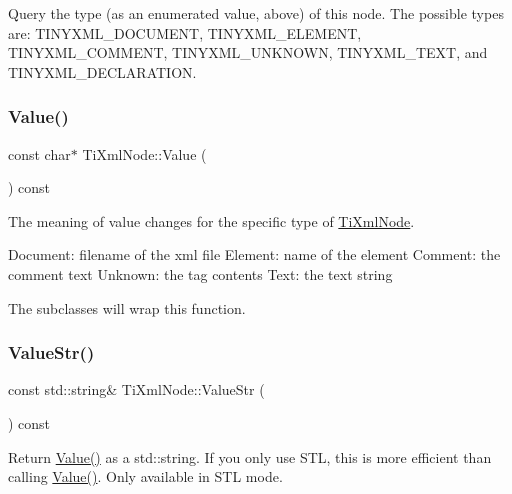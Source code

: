 Query the type (as an enumerated value, above) of this node. The possible types are\+: T\+I\+N\+Y\+X\+M\+L\+\_\+\+D\+O\+C\+U\+M\+E\+NT, T\+I\+N\+Y\+X\+M\+L\+\_\+\+E\+L\+E\+M\+E\+NT, T\+I\+N\+Y\+X\+M\+L\+\_\+\+C\+O\+M\+M\+E\+NT, T\+I\+N\+Y\+X\+M\+L\+\_\+\+U\+N\+K\+N\+O\+WN, T\+I\+N\+Y\+X\+M\+L\+\_\+\+T\+E\+XT, and T\+I\+N\+Y\+X\+M\+L\+\_\+\+D\+E\+C\+L\+A\+R\+A\+T\+I\+ON. \mbox{\label{class_ti_xml_node_ad44dfe927d49a74dd78b72b7514417ad}} 
\subsubsection{\texorpdfstring{Value()}{Value()}}
{\footnotesize\ttfamily const char$\ast$ Ti\+Xml\+Node\+::\+Value (\begin{DoxyParamCaption}{ }\end{DoxyParamCaption}) const\hspace{0.3cm}{\ttfamily [inline]}}

The meaning of \textquotesingle{}value\textquotesingle{} changes for the specific type of \hyperlink{class_ti_xml_node}{Ti\+Xml\+Node}. \begin{DoxyVerb}Document:   filename of the xml file
Element:    name of the element
Comment:    the comment text
Unknown:    the tag contents
Text:       the text string
\end{DoxyVerb}


The subclasses will wrap this function. \mbox{\label{class_ti_xml_node_a74bda074919e4a5e08d700204793f898}} 
\subsubsection{\texorpdfstring{Value\+Str()}{ValueStr()}}
{\footnotesize\ttfamily const std\+::string\& Ti\+Xml\+Node\+::\+Value\+Str (\begin{DoxyParamCaption}{ }\end{DoxyParamCaption}) const\hspace{0.3cm}{\ttfamily [inline]}}

Return \hyperlink{class_ti_xml_node_ad44dfe927d49a74dd78b72b7514417ad}{Value()} as a std\+::string. If you only use S\+TL, this is more efficient than calling \hyperlink{class_ti_xml_node_ad44dfe927d49a74dd78b72b7514417ad}{Value()}. Only available in S\+TL mode. 

